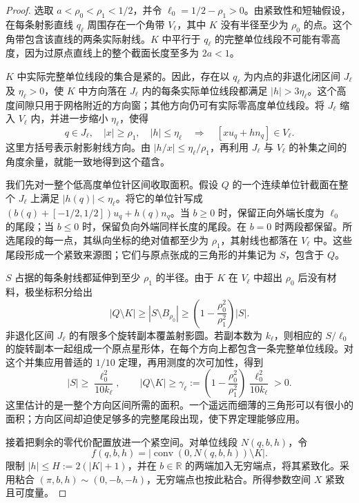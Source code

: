 \begin{proof}
选取 $a<\rho_0<\rho_1<1/2$，并令 $\ell_0=1/2-\rho_1>0$。由紧致性和短轴假设，在每条射影直线 $q_\ell$ 周围存在一个角带 $V_\ell$，其中 $K$ 没有半径至少为 $\rho_0$ 的点。这个角带包含该直线的两条实际射线。$K$ 中平行于 $q_\ell$ 的完整单位线段不可能有零高度，因为过原点直线上的整个截面长度至多为 $2a<1$。

$K$ 中实际完整单位线段的集合是紧的。因此，存在以 $q_\ell$ 为内点的非退化闭区间 $J_\ell$ 及 $\eta_\ell>0$，使 $K$ 中方向落在 $J_\ell$ 内的每条实际单位线段都满足 $|h|>3\eta_\ell$。这个高度间隙只用于网格附近的方向窗；其他方向仍可有实际零高度单位线段。将 $J_\ell$ 缩入 $V_\ell$ 内，并进一步缩小 $\eta_\ell$，使得
\[
 q\in J_\ell,\quad |x|\ge\rho_1,\quad |h|\le\eta_\ell
 \quad\Longrightarrow\quad [xu_q+hn_q]\in V_\ell.
\]
这里方括号表示射影射线方向。由 $|h/x|\le\eta_\ell/\rho_1$，再利用 $J_\ell$ 与 $V_\ell$ 的补集之间的角度余量，就能一致地得到这个蕴含。

我们先对一整个低高度单位针区间收取面积。假设 $Q$ 的一个连续单位针截面在整个 $J_\ell$ 上满足 $|h(q)|<\eta_\ell$。将它的单位针写成 $(b(q)+[-1/2,1/2])u_q+h(q)n_q$。当 $b\ge0$ 时，保留正向外端长度为 $\ell_0$ 的尾段；当 $b\le0$ 时，保留负向外端同样长度的尾段。在 $b=0$ 时两段都保留。所选尾段的每一点，其纵向坐标的绝对值都至少为 $\rho_1$，其射线也都落在 $V_\ell$ 中。这些尾段形成一个紧致来源图；它们与原点张成的三角形的并集记为 $S$，包含于 $Q$。

$S$ 占据的每条射线都延伸到至少 $\rho_1$ 的半径。由于 $K$ 在 $V_\ell$ 中超出 $\rho_0$ 后没有材料，极坐标积分给出
\begin{equation}\label{eq:tail-relative-bank}
 |Q\setminus K|\ge |S\setminus B_{\rho_0}|
 \ge \left(1-\frac{\rho_0^2}{\rho_1^2}\right)|S|.
\end{equation}
非退化区间 $J_\ell$ 的有限多个旋转副本覆盖射影圆。若副本数为 $k_\ell$，则相应的 $S/\ell_0$ 的旋转副本一起组成一个原点星形体，在每个方向上都包含一条完整单位线段。对这个并集应用普适的 $1/10$ 定理，再用测度的次可加性，得到
\[
 |S|\ge\frac{\ell_0^2}{10k_\ell},\qquad
 |Q\setminus K|\ge
 \gamma_\ell:=\left(1-\frac{\rho_0^2}{\rho_1^2}\right)
 \frac{\ell_0^2}{10k_\ell}>0.
\]
这里估计的是一整个方向区间所需的面积。一个遥远而细薄的三角形可以有很小的面积；方向区间却迫使足够多的完整尾段出现，使下界定理能够应用。

接着把剩余的零代价配置放进一个紧空间。对单位线段 $N(q,b,h)$，令
\[
 f(q,b,h)=|\operatorname{conv}(0,N(q,b,h))\setminus K|.
\]
限制 $|h|\le H:=2(|K|+1)$，并在 $b\in\mathbb{R}$ 的两端加入无穷端点，将其紧致化。采用粘合 $(\pi,b,h)\sim(0,-b,-h)$，无穷端点也按此粘合。所得参数空间 $X$ 紧致且可度量。


\end{proof}
